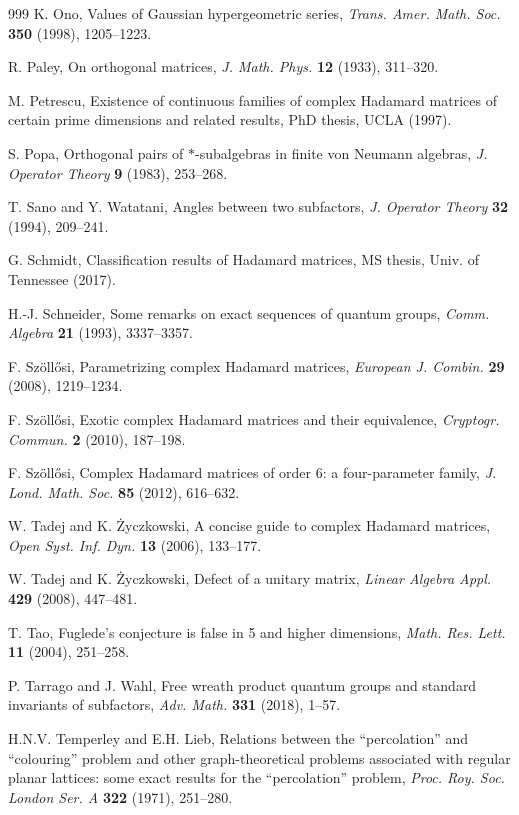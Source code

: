 \documentclass[11pt]{amsart}
\begin{document}
\begin{thebibliography}{999}
 K. Ono, Values of Gaussian hypergeometric series, {\em Trans. Amer. Math. Soc.} {\bf 350} (1998), 1205--1223.

 R. Paley, On orthogonal matrices, {\em J. Math. Phys.} {\bf 12} (1933), 311--320.

 M. Petrescu, Existence of continuous families of complex Hadamard matrices of certain prime dimensions and related results, PhD thesis, UCLA (1997).

 S. Popa, Orthogonal pairs of $*$-subalgebras in finite von Neumann algebras, {\em J. Operator Theory} {\bf 9} (1983), 253--268.

 T. Sano and Y. Watatani, Angles between two subfactors, {\em J. Operator Theory} {\bf 32} (1994), 209--241.

 G. Schmidt, Classification results of Hadamard matrices, MS thesis, Univ. of Tennessee (2017).

 H.-J. Schneider, Some remarks on exact sequences of quantum groups, {\em Comm. Algebra} {\bf 21} (1993), 3337--3357.

 F. Sz\"oll\H{o}si, Parametrizing complex Hadamard matrices, {\em European J. Combin.} {\bf 29} (2008), 1219--1234.

 F. Sz\"oll\H{o}si, Exotic complex Hadamard matrices and their equivalence, {\em Cryptogr. Commun.} {\bf 2} (2010), 187--198.

 F. Sz\"oll\H{o}si, Complex Hadamard matrices of order 6: a four-parameter family, {\em J. Lond. Math. Soc.} {\bf 85} (2012), 616--632.

 W. Tadej and K. \.Zyczkowski, A concise guide to complex Hadamard matrices, {\em Open Syst. Inf. Dyn.} {\bf 13} (2006), 133--177.

 W. Tadej and K. \.Zyczkowski, Defect of a unitary matrix, {\em Linear Algebra Appl.} {\bf 429} (2008), 447--481.

 T. Tao, Fuglede's conjecture is false in 5 and higher dimensions, {\em Math. Res. Lett.} {\bf 11} (2004), 251--258.

 P. Tarrago and J. Wahl, Free wreath product quantum groups and standard invariants of subfactors, {\em Adv. Math.} {\bf 331} (2018), 1--57.

 H.N.V. Temperley and E.H. Lieb, Relations between the ``percolation'' and ``colouring'' problem and other graph-theoretical problems associated with regular planar lattices: some exact results for the ``percolation'' problem, {\em Proc. Roy. Soc. London Ser. A} {\bf 322} (1971), 251--280.


\end{thebibliography}
\end{document}
